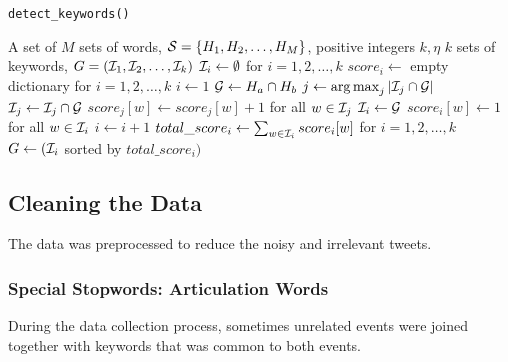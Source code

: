 
\begin{algorithm}
  \caption{\tt{detect\_keywords()}}
  \label{alg:detect_keywords}
  \begin{algorithmic}[1]
    \REQUIRE A set of $M$ sets of words, $\mathcal{S}= \{H_1,H_2, \ldots,
    H_M\}$, positive integers $k, \eta$ \ENSURE $k$ sets of keywords,
    $G = (\mathcal{I}_1,\mathcal{I}_2,\ldots,\mathcal{I}_{k})$ \STATE $\mathcal{I}_i \leftarrow \emptyset$
    for $i = 1,2,
    \ldots,k$ %
    \STATE $score_i \leftarrow$ empty dictionary for $i = 1, 2,
    \ldots,k$ %
    \STATE $i \leftarrow 1$  \STATE $\mathcal{G}
    \leftarrow H_a \cap H_b$
    \label{alg:line:intersect} %
    \STATE $j \leftarrow \operatorname{arg\,max}_j |\mathcal{I}_j \cap \mathcal{G}|$
     \STATE $\mathcal{I}_j \leftarrow \mathcal{I}_j \cap
    \mathcal{G}$ \STATE $score_{j}[w] \leftarrow score_{j}[w] + 1$ for all $w
    \in \mathcal{I}_j$ \ELSE \STATE $\mathcal{I}_i \leftarrow
    \mathcal{G}$ \label{alg:line:create} \STATE $score_{i}[w] \leftarrow 1$ for
    all $w \in \mathcal{I}_i$ \STATE $i \leftarrow i + 1$
    \ENDIF
    \ENDFOR
    \STATE $total\_score_i \leftarrow \sum_{w \in \mathcal{I}_i} score_{i}[w]$
    for $i = 1,2,\ldots,k$ \RETURN $G \leftarrow (\mathcal{I}_i$ sorted by
    $total\_score_i)$
  \end{algorithmic}
\end{algorithm}

\subsection{Cleaning the Data}
The data was preprocessed to reduce the noisy and irrelevant tweets.

\subsubsection{Special Stopwords:  Articulation Words}
During the data collection process, sometimes
unrelated events were joined together with keywords that was common to
both events.  

